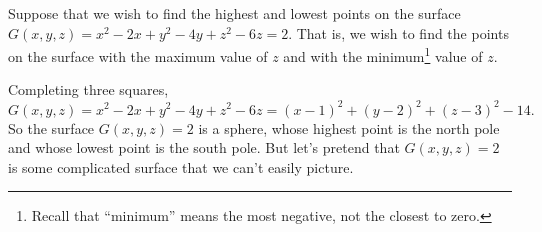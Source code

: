 \begin{eg}\label{eg tan plane E}
Suppose that we wish to find the highest and lowest points on the 
surface $G(x,y,z) = x^2-2x +y^2-4y + z^2-6z = 2$. That is, we wish
to find the points on the surface with the maximum value of $z$
and with the minimum\footnote{Recall that ``minimum'' means the most
negative, not the closest to zero.} value of $z$.

Completing three squares,
\begin{equation*}
G(x,y,z) = x^2-2x +y^2-4y + z^2-6z
         =(x-1)^2 +(y-2)^2 +(z-3)^2 - 14.
\end{equation*}
So the surface $G(x,y,z)=2$ is a sphere, whose highest point is
the north pole and whose lowest point is the south pole. But let's
pretend that $G(x,y,z)=2$ is some complicated surface that we can't 
easily picture. 


\end{eg}
